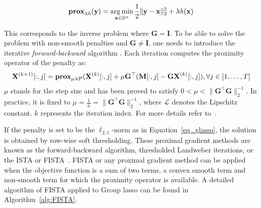 \begin{equation}
\textbf{prox}_{\lambda\mathit{h}}(\mathbf{y})=\mathop{\mathrm{arg}\,\mathrm{min}}_{\mathbf{x}\in\mathbb{R}^n}\frac{1}{2}\|\mathbf{y}-\mathbf{x}\|_2^2+\lambda\mathit{h}(\mathbf{x})
\end{equation}

This corresponds to the inverse problem where $\mathbf{G}=\mathbf{I}$. To be able to solve the problem with non-smooth penalties and $\mathbf{G}\neq\mathbf{I}$, one needs to introduce the iterative \textit{forward-backward} algorithm \cite{moreau1965proximite}. Each iteration computes the proximity operator of the penalty as:
\begin{equation}
\mathbf{X}^{(k+1)}[:,j]=\textbf{prox}_{\mu\lambda\mathcal{P}}(\mathbf{X}^{(k)}[:,j]+\mu\mathbf{G}^\top(\mathbf{M}[:,j]-\mathbf{GX}^{(k)}[:,j]), \forall j\in [1,\dots ,T]
\end{equation}
$\mu$ stands for the step size and has been proved to satisfy $0<\mu<\|\mathbf{G}^\top\mathbf{G}\|_2^{-1}$. In practice, it is fixed to $\mu=\frac{1}{\mathcal{L}}=
 \|\mathbf{G}^\top\mathbf{G}\|_2^{-1}$, where $\mathcal{L}$ denotes the Lipschitz constant. $k$ represents the iteration index. For more details refer to~\cite{moreau1965proximite,combettes2005signal,daubechies2004iterative}.

If the penalty is set to be the $\ell_{2,1}$-norm as in Equation~\eqref{eq_glasso}, the solution is obtained by row-wise soft thresholding. These proximal gradient methods are known as the forward-backward algorithm, thresholded Landweber iterations, or the \ac{ISTA} or \ac{FISTA}~\cite{bach-etal:2012,parikh2014proximal}. FISTA or any proximal gradient method can be applied when the objective function is a sum of two terms, a convex smooth term and non-smooth term for which the proximity operator is available.
A detailed algorithm of FISTA applied to Group \ac{lasso} can be found in Algorithm~\ref{alg:FISTA}. 

